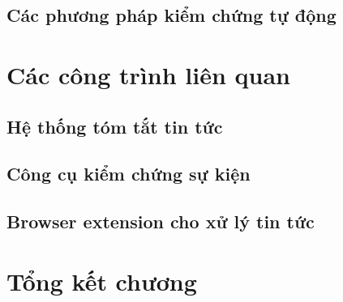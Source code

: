 \subsection{Các phương pháp kiểm chứng tự động}

\section{Các công trình liên quan}

\subsection{Hệ thống tóm tắt tin tức}

\subsection{Công cụ kiểm chứng sự kiện}

\subsection{Browser extension cho xử lý tin tức}

\section{Tổng kết chương}
